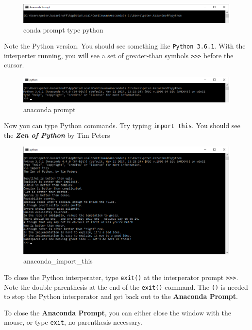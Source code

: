 \documentclass{book}
\makeatletter
\def\maxwidth{\ifdim\Gin@nat@width>\linewidth\linewidth
    \else\Gin@nat@width\fi}
\let\Oldincludegraphics\includegraphics
\renewcommand{\includegraphics}[1]{\Oldincludegraphics[width=.8\maxwidth]{#1}}
\makeatother
\begin{document}
\begin{figure}
\centering
\includegraphics{images/conda_prompt_type_python.png}
\caption{conda prompt type python}
\end{figure}

Note the Python version. You should see something like
\lstinline!Python 3.6.1!. With the interperter running, you will see a
set of greater-than symbols \lstinline!>>>! before the cursor.

\begin{figure}
\centering
\includegraphics{images/conda_type_python.png}
\caption{anaconda prompt}
\end{figure}

Now you can type Python commands. Try typing \lstinline!import this!.
You should see the \textbf{\emph{Zen of Python}} by Tim Peters

\begin{figure}
\centering
\includegraphics{images/conda_import_this_output.png}
\caption{anaconda\_import\_this}
\end{figure}

To close the Python interperater, type \lstinline!exit()! at the
interperator prompt \lstinline!>>>!. Note the double parenthesis at the
end of the \lstinline!exit()! command. The \lstinline!()! is needed to
stop the Python interperator and get back out to the \textbf{Anaconda
Prompt}.

To close the \textbf{Anaconda Prompt}, you can either close the window
with the mouse, or type \lstinline!exit!, no parenthesis necessary.
\end{document}
